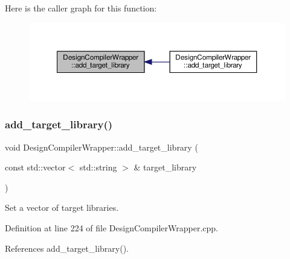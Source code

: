 Here is the caller graph for this function\+:
\nopagebreak
\begin{figure}[H]
\begin{center}
\leavevmode
\includegraphics[width=350pt]{d5/d55/classDesignCompilerWrapper_a8452f034e2bfc1c8b0fb2a3b4353eb88_icgraph}
\end{center}
\end{figure}
\mbox{\label{classDesignCompilerWrapper_a5da5846f6792e3f3ca31481ed2efd252}} 
\subsubsection{\texorpdfstring{add\+\_\+target\+\_\+library()}{add\_target\_library()}\hspace{0.1cm}{\footnotesize\ttfamily [2/2]}}
{\footnotesize\ttfamily void Design\+Compiler\+Wrapper\+::add\+\_\+target\+\_\+library (\begin{DoxyParamCaption}\item[{const std\+::vector$<$ std\+::string $>$ \&}]{target\+\_\+library }\end{DoxyParamCaption})}



Set a vector of target libraries. 



Definition at line 224 of file Design\+Compiler\+Wrapper.\+cpp.



References add\+\_\+target\+\_\+library().

